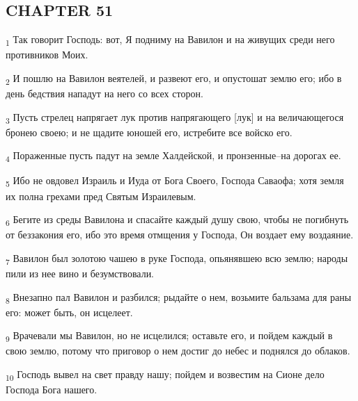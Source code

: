 \subsection{CHAPTER 51}
\begin{tcolorbox}
\textsubscript{1} Так говорит Господь: вот, Я подниму на Вавилон и на живущих среди него противников Моих.
\end{tcolorbox}
\begin{tcolorbox}
\textsubscript{2} И пошлю на Вавилон веятелей, и развеют его, и опустошат землю его; ибо в день бедствия нападут на него со всех сторон.
\end{tcolorbox}
\begin{tcolorbox}
\textsubscript{3} Пусть стрелец напрягает лук против напрягающего [лук] и на величающегося бронею своею; и не щадите юношей его, истребите все войско его.
\end{tcolorbox}
\begin{tcolorbox}
\textsubscript{4} Пораженные пусть падут на земле Халдейской, и пронзенные--на дорогах ее.
\end{tcolorbox}
\begin{tcolorbox}
\textsubscript{5} Ибо не овдовел Израиль и Иуда от Бога Своего, Господа Саваофа; хотя земля их полна грехами пред Святым Израилевым.
\end{tcolorbox}
\begin{tcolorbox}
\textsubscript{6} Бегите из среды Вавилона и спасайте каждый душу свою, чтобы не погибнуть от беззакония его, ибо это время отмщения у Господа, Он воздает ему воздаяние.
\end{tcolorbox}
\begin{tcolorbox}
\textsubscript{7} Вавилон был золотою чашею в руке Господа, опьянявшею всю землю; народы пили из нее вино и безумствовали.
\end{tcolorbox}
\begin{tcolorbox}
\textsubscript{8} Внезапно пал Вавилон и разбился; рыдайте о нем, возьмите бальзама для раны его: может быть, он исцелеет.
\end{tcolorbox}
\begin{tcolorbox}
\textsubscript{9} Врачевали мы Вавилон, но не исцелился; оставьте его, и пойдем каждый в свою землю, потому что приговор о нем достиг до небес и поднялся до облаков.
\end{tcolorbox}
\begin{tcolorbox}
\textsubscript{10} Господь вывел на свет правду нашу; пойдем и возвестим на Сионе дело Господа Бога нашего.
\end{tcolorbox}
